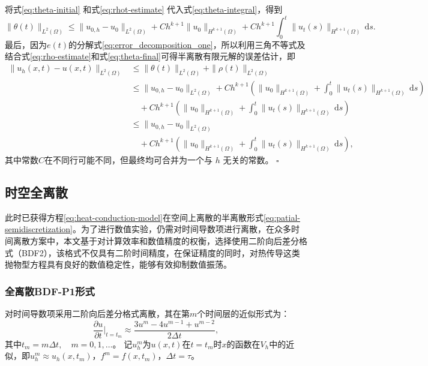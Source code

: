\documentclass{GZUbachelorthesis}
\makeatletter
\renewcommand{\proofname}{证明}
\renewenvironment{proof}[1][\proofname]{\par
	\normalfont
	\topsep6\p@\@plus6\p@\relax
	\trivlist
	\setlength{\itemindent}{2em}%
	\item[\hskip\labelsep{\songti #1：}]\ignorespaces
}{\hfill\ensuremath{\square}\endtrivlist\@endpefalse}
\theoremstyle{chineseplain}
\makeatother
\begin{document}
\begin{proof}
\begin{equation}
		\label{eq:rhot-estimate}
	\end{equation}
	将式\eqref{eq:theta-initial} 和式\eqref{eq:rhot-estimate} 代入式\eqref{eq:theta-integral}，得到
	\begin{equation}
		\|\theta(t)\|_{L^2(\Omega)} \leq \|u_{0,h}-u_0\|_{L^2(\Omega)}+C h^{k+1} \|u_0\|_{H^{k+1}(\Omega)} + C h^{k+1} \int_0^t \|u_t(s)\|_{H^{k+1}(\Omega)}\,\mathrm{d}s. 
		\label{eq:theta-final}
	\end{equation}
	最后，因为$e(t)$的分解式\eqref{eq:error_decomposition_one}，所以利用三角不等式及结合式\eqref{eq:rho-estimate}和式\eqref{eq:theta-final}可得半离散有限元解的误差估计，即
	\begin{equation}
		\begin{aligned}
			\|u_h(x,t)-u(x,t)\|_{L^2(\Omega)}
			&\leq \|\theta(t)\|_{L^2(\Omega)} + \|\rho(t)\|_{L^2(\Omega)} \\
			&\leq \|u_{0,h}-u_0\|_{L^2(\Omega)} + C h^{k+1} \left( \|u_0\|_{H^{k+1}(\Omega)} + \int_0^t \|u_t(s)\|_{H^{k+1}(\Omega)}\,\mathrm{d}s \right) \\
			&\quad +C h^{k+1} \left( \|u_0\|_{H^{k+1}(\Omega)}+\int_0^t \|u_t(s)\|_{H^{k+1}(\Omega)}\,\mathrm{d}s \right) \\
			&\leq \|u_{0,h}-u_0\|_{L^2(\Omega)} \\
			&\quad +C h^{k+1} \left( \|u_0\|_{H^{k+1}(\Omega)}+\int_0^t \|u_t(s)\|_{H^{k+1}(\Omega)}\,\mathrm{d}s \right),
		\end{aligned}
		\label{eq:final-error-estimate}
	\end{equation}
	其中常数$C$在不同行可能不同，但最终均可合并为一个与 $h$ 无关的常数。
\end{proof}
\subsection{时空全离散}
此时已获得方程\eqref{eq:heat-conduction-model}在空间上离散的半离散形式\eqref{eq:patial-semidiscretization}。为了进行数值实验，仍需对时间导数项进行离散，在众多时间离散方案中，本文基于对计算效率和数值精度的权衡，选择使用二阶向后差分格式（BDF2），该格式不仅具有二阶时间精度，在保证精度的同时，对热传导这类抛物型方程具有良好的数值稳定性，能够有效抑制数值振荡。
\subsubsection{全离散BDF-P1形式}
对时间导数项采用二阶向后差分格式离散，其在第$m$个时间层的近似形式为：
\begin{equation}\label{eq:BDF2_approx}
	\frac{\partial u}{\partial t} \bigg|_{t=t_m} \approx \frac{3u^m - 4u^{m-1} + u^{m-2}}{2\Delta t},
\end{equation}
其中$t_m=m\Delta t,\quad m = 0,1,\dots$。
记$u_h^m$为$u(x,t)$在$t=t_m$时$x$的函数在$V_h$中的近似，即$u_h^m \approx u_h(x,t_m)$，$f^m = f(x, t_m)$，$\Delta t=\tau$。
\end{document}
